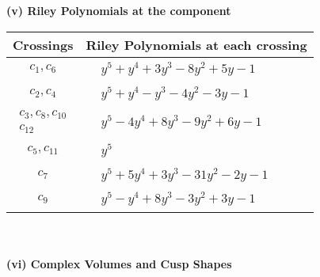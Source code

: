 \documentclass[1p]{elsarticle_modified}
\theoremstyle{definition}
\begin{document}
\newpage\renewcommand{\arraystretch}{1}
\flushleft \textbf{(v) Riley Polynomials at the component}\newline \\
\begin{tabular}{m{50pt}|m{274pt}}
Crossings & \hspace{64pt}Riley Polynomials at each crossing \\
\hline $$\begin{aligned}c_{1},c_{6}\end{aligned}$$&$\begin{aligned}
&y^5+y^4+3 y^3-8 y^2+5 y-1
\end{aligned}$\\
\hline $$\begin{aligned}c_{2},c_{4}\end{aligned}$$&$\begin{aligned}
&y^5+y^4- y^3-4 y^2-3 y-1
\end{aligned}$\\
\hline $$\begin{aligned}c_{3},c_{8},c_{10}\\c_{12}\end{aligned}$$&$\begin{aligned}
&y^5-4 y^4+8 y^3-9 y^2+6 y-1
\end{aligned}$\\
\hline $$\begin{aligned}c_{5},c_{11}\end{aligned}$$&$\begin{aligned}
&y^5
\end{aligned}$\\
\hline $$\begin{aligned}c_{7}\end{aligned}$$&$\begin{aligned}
&y^5+5 y^4+3 y^3-31 y^2-2 y-1
\end{aligned}$\\
\hline $$\begin{aligned}c_{9}\end{aligned}$$&$\begin{aligned}
&y^5- y^4+8 y^3-3 y^2+3 y-1
\end{aligned}$\\
\hline
\end{tabular}\\~\\
\newpage\flushleft \textbf{(vi) Complex Volumes and Cusp Shapes}
\end{document}
